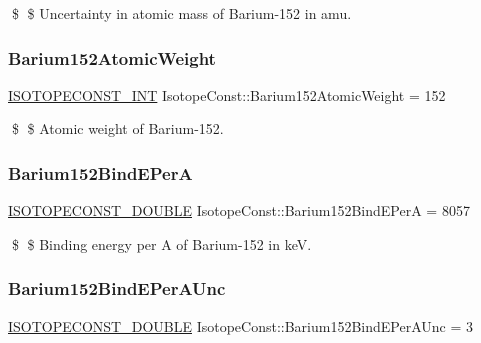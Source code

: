 \$ \$ Uncertainty in atomic mass of Barium-\/152 in amu. \mbox{\label{group___isotope_const-_barium-_ba152_ga3ea3acdf7144cf571776cf14c00fd959}} 
\subsubsection{\texorpdfstring{Barium152\+Atomic\+Weight}{Barium152AtomicWeight}}
{\footnotesize\ttfamily \mbox{\hyperlink{group___isotope_const-_macros_ga5f18360b3e99483a35c32d789e62621c}{I\+S\+O\+T\+O\+P\+E\+C\+O\+N\+S\+T\+\_\+\+I\+NT}} Isotope\+Const\+::\+Barium152\+Atomic\+Weight = 152}

\$ \$ Atomic weight of Barium-\/152. \mbox{\label{group___isotope_const-_barium-_ba152_gae64acce340990a4b0d5827e6952ffe04}} 
\subsubsection{\texorpdfstring{Barium152\+Bind\+E\+PerA}{Barium152BindEPerA}}
{\footnotesize\ttfamily \mbox{\hyperlink{group___isotope_const-_macros_ga8f45a7272ce02c0b4c65c44636ed719a}{I\+S\+O\+T\+O\+P\+E\+C\+O\+N\+S\+T\+\_\+\+D\+O\+U\+B\+LE}} Isotope\+Const\+::\+Barium152\+Bind\+E\+PerA = 8057}

\$ \$ Binding energy per A of Barium-\/152 in keV. \mbox{\label{group___isotope_const-_barium-_ba152_gae3cd486632f565a600d61fb32197a68f}} 
\subsubsection{\texorpdfstring{Barium152\+Bind\+E\+Per\+A\+Unc}{Barium152BindEPerAUnc}}
{\footnotesize\ttfamily \mbox{\hyperlink{group___isotope_const-_macros_ga8f45a7272ce02c0b4c65c44636ed719a}{I\+S\+O\+T\+O\+P\+E\+C\+O\+N\+S\+T\+\_\+\+D\+O\+U\+B\+LE}} Isotope\+Const\+::\+Barium152\+Bind\+E\+Per\+A\+Unc = 3}

